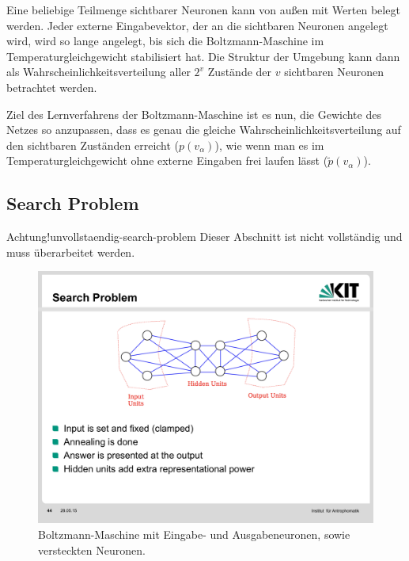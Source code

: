 Eine beliebige Teilmenge sichtbarer Neuronen kann von außen mit Werten belegt werden. Jeder externe Eingabevektor, der an die sichtbaren Neuronen angelegt wird, wird so lange angelegt, bis sich die Boltzmann-Maschine im Temperaturgleichgewicht stabilisiert hat. Die Struktur der Umgebung kann dann als Wahrscheinlichkeitsverteilung aller $2^v$ Zustände der $v$ sichtbaren Neuronen betrachtet werden.

Ziel des Lernverfahrens der Boltzmann-Maschine ist es nun, die Gewichte des Netzes so anzupassen, dass es genau die gleiche Wahrscheinlichkeitsverteilung auf den sichtbaren Zuständen erreicht ($p(v_{\alpha})$), wie wenn man es im Temperaturgleichgewicht ohne externe Eingaben frei laufen lässt ($\tilde{p}(v_{\alpha})$).


\subsection*{Search Problem}
\begin{hint}{Achtung!}{unvollstaendig-search-problem}
	Dieser Abschnitt ist nicht vollständig und muss überarbeitet werden.
\end{hint}

\begin{figure}[ht!] \centering 
	\includegraphics[width=\linewidth]{figures/ch10_boltzmann-search-problem.pdf}
	\caption{Boltzmann-Maschine mit Eingabe- und Ausgabeneuronen, sowie versteckten Neuronen.}
	\label{fig:ch10_boltzmann-search-problem}
\end{figure}



